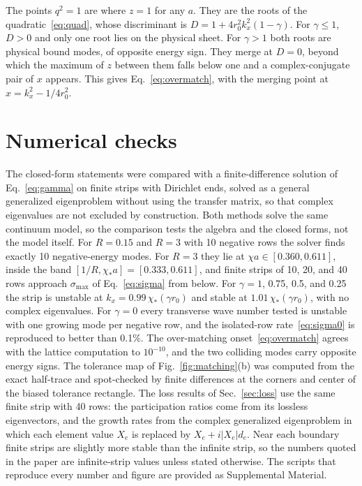 \documentclass[aps,prapplied,twocolumn,superscriptaddress,floatfix,longbibliography]{revtex4-2}
\begin{document}
The points $q^2=1$ are where $z=1$ for any $a$. They are the roots of the quadratic~\eqref{eq:quad}, whose discriminant is $D=1+4r_0^2k_x^2(1-\gamma)$. For $\gamma\le1$, $D>0$ and only one root lies on the physical sheet. For $\gamma>1$ both roots are physical bound modes, of opposite energy sign. They merge at $D=0$, beyond which the maximum of $z$ between them falls below one and a complex-conjugate pair of $x$ appears. This gives Eq.~\eqref{eq:overmatch}, with the merging point at $x=k_x^2-1/4r_0^2$.

\section{Numerical checks}
\label{app:numerics}

The closed-form statements were compared with a finite-difference solution of Eq.~\eqref{eq:gamma} on finite strips with Dirichlet ends, solved as a general generalized eigenproblem without using the transfer matrix, so that complex eigenvalues are not excluded by construction. Both methods solve the same continuum model, so the comparison tests the algebra and the closed forms, not the model itself. For $R=0.15$ and $R=3$ with 10 negative rows the solver finds exactly 10 negative-energy modes. For $R=3$ they lie at $\chi a\in[0.360,0.611]$, inside the band $[1/R,\chi_*a]=[0.333,0.611]$, and finite strips of 10, 20, and 40 rows approach $\sigma_{\max}$ of Eq.~\eqref{eq:sigma} from below. For $\gamma=1$, 0.75, 0.5, and 0.25 the strip is unstable at $k_x=0.99\,\chi_*(\gamma r_0)$ and stable at $1.01\,\chi_*(\gamma r_0)$, with no complex eigenvalues. For $\gamma=0$ every transverse wave number tested is unstable with one growing mode per negative row, and the isolated-row rate~\eqref{eq:sigma0} is reproduced to better than 0.1\%. The over-matching onset~\eqref{eq:overmatch} agrees with the lattice computation to $10^{-10}$, and the two colliding modes carry opposite energy signs. The tolerance map of Fig.~\ref{fig:matching}(b) was computed from the exact half-trace and spot-checked by finite differences at the corners and center of the biased tolerance rectangle. The loss results of Sec.~\ref{sec:loss} use the same finite strip with 40 rows: the participation ratios come from its lossless eigenvectors, and the growth rates from the complex generalized eigenproblem in which each element value $X_e$ is replaced by $X_e+i|X_e|d_e$. Near each boundary finite strips are slightly more stable than the infinite strip, so the numbers quoted in the paper are infinite-strip values unless stated otherwise. The scripts that reproduce every number and figure are provided as Supplemental Material.
\end{document}
